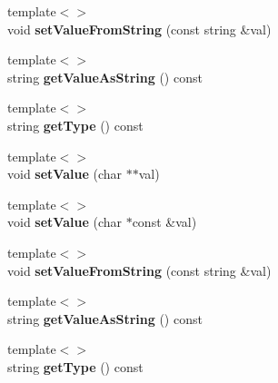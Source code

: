 \begin{DoxyCompactItemize}
\item 
\hypertarget{classrrp_1_1_parameter_a1621a0f9b6cd7c6973f1a660622becf7}{{\footnotesize template$<$$>$ }\\void {\bfseries set\-Value\-From\-String} (const string \&val)}\label{classrrp_1_1_parameter_a1621a0f9b6cd7c6973f1a660622becf7}

\item 
\hypertarget{classrrp_1_1_parameter_a2f3b3ce7dbe0f955aa7c177637f9fbb0}{{\footnotesize template$<$$>$ }\\string {\bfseries get\-Value\-As\-String} () const}\label{classrrp_1_1_parameter_a2f3b3ce7dbe0f955aa7c177637f9fbb0}

\item 
\hypertarget{classrrp_1_1_parameter_a49aebd913ae26cd0a3c2cce3c758171e}{{\footnotesize template$<$$>$ }\\string {\bfseries get\-Type} () const}\label{classrrp_1_1_parameter_a49aebd913ae26cd0a3c2cce3c758171e}

\item 
\hypertarget{classrrp_1_1_parameter_afb4058790333941bfb14a619bfe1a208}{{\footnotesize template$<$$>$ }\\void {\bfseries set\-Value} (char $\ast$$\ast$val)}\label{classrrp_1_1_parameter_afb4058790333941bfb14a619bfe1a208}

\item 
\hypertarget{classrrp_1_1_parameter_ada29da9f190100b80708fdbfb6da8695}{{\footnotesize template$<$$>$ }\\void {\bfseries set\-Value} (char $\ast$const \&val)}\label{classrrp_1_1_parameter_ada29da9f190100b80708fdbfb6da8695}

\item 
\hypertarget{classrrp_1_1_parameter_a1621a0f9b6cd7c6973f1a660622becf7}{{\footnotesize template$<$$>$ }\\void {\bfseries set\-Value\-From\-String} (const string \&val)}\label{classrrp_1_1_parameter_a1621a0f9b6cd7c6973f1a660622becf7}

\item 
\hypertarget{classrrp_1_1_parameter_a2f3b3ce7dbe0f955aa7c177637f9fbb0}{{\footnotesize template$<$$>$ }\\string {\bfseries get\-Value\-As\-String} () const}\label{classrrp_1_1_parameter_a2f3b3ce7dbe0f955aa7c177637f9fbb0}

\item 
\hypertarget{classrrp_1_1_parameter_a49aebd913ae26cd0a3c2cce3c758171e}{{\footnotesize template$<$$>$ }\\string {\bfseries get\-Type} () const}\label{classrrp_1_1_parameter_a49aebd913ae26cd0a3c2cce3c758171e}


\end{DoxyCompactItemize}
